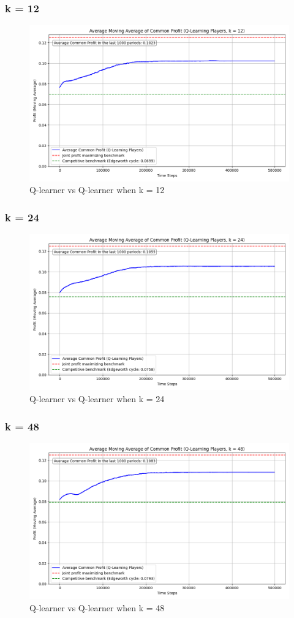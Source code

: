 \documentclass{article}
\begin{document}
\subsubsection{k = 12}
\begin{figure}[H]
    \centering
    \includegraphics[scale = 0.45]{K=12.png}
    \caption{Q-learner vs Q-learner when k = 12}
    \label{fig: QlearnervQlearnerK=12}
\end{figure}

\subsubsection{k = 24}
\begin{figure}[H]
    \centering
    \includegraphics[scale = 0.45]{K=24.png}
    \caption{Q-learner vs Q-learner when k = 24}
    \label{fig: QlearnervQlearnerK=24}
\end{figure}

\subsubsection{k = 48}
\begin{figure}[H]
    \centering
    \includegraphics[scale = 0.45]{K=48.png}
    \caption{Q-learner vs Q-learner when k = 48}
    \label{fig: QlearnervQlearnerK=48}
\end{figure}
\end{document}
